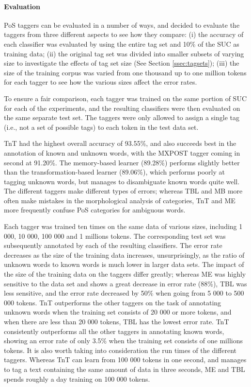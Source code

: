 \documentclass[a4paper,12pt,english]{book}
\begin{document}
\paragraph{Evaluation}
PoS taggers can be evaluated in a number of ways, and  decided to
evaluate the taggers from three different aspects to see how they compare: (i)
the accuracy of each classifier was evaluated by using the entire tag set and
10\% of the SUC as training data; (ii) the original tag set was divided into
smaller subsets of varying size to investigate the effects of tag set size (See
Section \ref{ssec:tagsets}); (iii) the size of the training corpus was varied
from one thousand up to one million tokens for each tagger to see how the
various sizes affect the error rates.

To ensure a fair comparison, each tagger was trained on the same portion of SUC
for each of the experiments, and the resulting classifiers were then evaluated
on the same separate test set. The taggers were only allowed to assign a single
tag (i.e., not a set of possible tags) to each token in the test data set.

TnT had the highest overall accuracy of 93.55\%, and also succeeds best in the
annotation of known and unknown words, with the MXPOST tagger coming in second
at 91.20\%. The memory-based learner (89.28\%) performs slightly better than
the transformation-based learner (89.06\%), which performs poorly at tagging
unknown words, but manages to disambiguate known words quite well. The
different taggers make different types of errors; whereas TBL and MB more often
make mistakes in the morphological analysis of categories, TnT and ME more
frequently confuse PoS categories for ambiguous words.

Each tagger was trained ten times on the same data of various sizes, including
1 000, 10 000, 100 000 and 1 millions tokens. The corresponding test set was
subsequently annotated by each of the resulting classifiers. The error rate
decreases as the size of the training data increases, unsurprisingly, as the
ratio of unknown words to known words is much lower in larger data sets. The
impact of the size of the training data on the taggers differ greatly; whereas
ME was highly sensitive to the data set and shows a great decrease in error
rate (88\%), TBL was less sensitive, and the error rate decreased by 50\% when
going from 5 000 to 500 000 tokens. TnT outperforms the other taggers on the
task of annotating unknown words when the training set consists of 20 000 or more
tokens, and when there are less than 20 000 tokens, TBL has the lowest error
rate. TnT consistently outperforms all the other taggers in annotating known
words, showing an error rate of only 3.5\% when the training set consists of
one millions tokens. It is also worth taking into consideration the run times
of the different taggers. Whereas TnT can learn from 100 000 tokens in one
second, and manages to tag a text containing the same amount of data in three
seconds, ME and TBL spends roughly a day training on 100 000 tokens.
\end{document}
